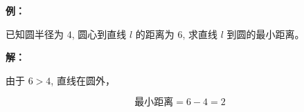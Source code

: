 \begin{examplebox}
\textbf{例：}

已知圆半径为 $4$,
圆心到直线 $l$ 的距离为 $6$,
求直线 $l$ 到圆的最小距离。

\textbf{解：}

由于 $6>4$,
直线在圆外，

\[
\text{最小距离}=6-4=2
\]
\end{examplebox}
